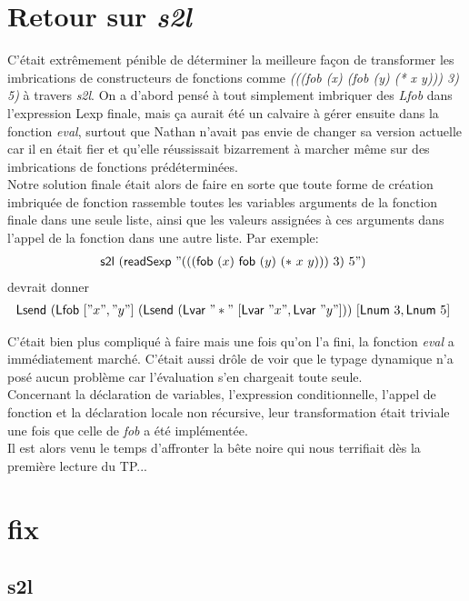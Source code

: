 \documentclass{article}
\begin{document}
\section{Retour sur \textit{s2l}}

C'était extrêmement pénible de déterminer la meilleure façon de transformer les imbrications de constructeurs de fonctions comme \textit{(((fob (x) (fob (y) (* x y))) 3) 5)} à travers \textit{s2l}. On a d'abord pensé à tout simplement imbriquer des \textit{Lfob} dans l'expression Lexp finale, mais ça aurait été un calvaire à gérer ensuite dans la fonction \textit{eval}, surtout que Nathan n'avait pas envie de changer sa version actuelle car il en était fier et qu'elle réussissait bizarrement à marcher même sur des imbrications de fonctions prédéterminées. \\
Notre solution finale était alors de faire en sorte que toute forme de création imbriquée de fonction rassemble toutes les variables arguments de la fonction finale dans une seule liste, ainsi que les valeurs assignées à ces arguments dans l'appel de la fonction dans une autre liste. Par exemple:
\begin{displaymath}
  \Align[c]{\kw{s2l}~(\kw{readSexp}~"(((\kw{fob}~(x)~\kw{fob}~(y)~(*~x~y)))~3)~5")}
\end{displaymath}
devrait donner
\begin{displaymath}
  \Align[c]{\kw{Lsend}~(\kw{Lfob}~["x","y"]~(\kw{Lsend}~(\kw{Lvar}~"*"~[\kw{Lvar}~"x",\kw{Lvar}~"y"]))~[\kw{Lnum}~3,\kw{Lnum}~5]}
\end{displaymath}

C'était bien plus compliqué à faire mais une fois qu'on l'a fini, la fonction \textit{eval} a immédiatement marché. C'était aussi drôle de voir que le typage dynamique n'a posé aucun problème car l'évaluation s'en chargeait toute seule. \\
Concernant la déclaration de variables, l'expression conditionnelle, l'appel de fonction et la déclaration locale non récursive, leur transformation était triviale une fois que celle de \textit{fob} a été implémentée. \\
Il est alors venu le temps d'affronter la bête noire qui nous terrifiait dès la première lecture du TP...

\section{fix}

\subsection{s2l}
\end{document}
